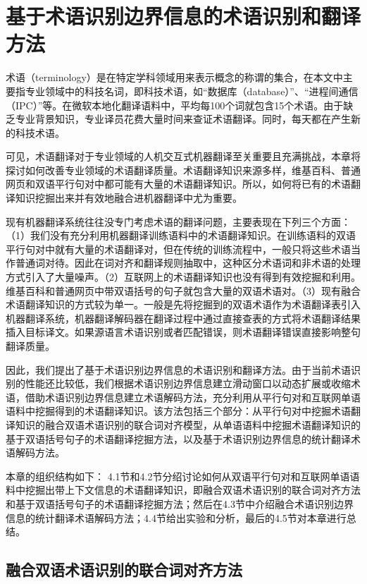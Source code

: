 
\chapter{基于术语识别边界信息的术语识别和翻译方法}
\label{Chapter_term}

术语（terminology）是在特定学科领域用来表示概念的称谓的集合，在本文中主要指专业领域中的科技名词，即科技术语，如“数据库（database）”、“进程间通信（IPC）”等。在微软本地化翻译语料中，平均每100个词就包含15个术语。由于缺乏专业背景知识，专业译员花费大量时间来查证术语翻译。同时，每天都在产生新的科技术语。

可见，术语翻译对于专业领域的人机交互式机器翻译至关重要且充满挑战，本章将探讨如何改善专业领域的术语翻译质量。术语翻译知识来源多样，维基百科、普通网页和双语平行句对中都可能有大量的术语翻译知识。所以，如何将已有的术语翻译知识挖掘出来并有效地融合进机器翻译中尤为重要。

现有机器翻译系统往往没专门考虑术语的翻译问题，主要表现在下列三个方面：（1）我们没有充分利用机器翻译训练语料中的术语翻译知识。在训练语料的双语平行句对中就有大量的术语翻译对，但在传统的训练流程中，一般只将这些术语当作普通词对待。因此在词对齐和翻译规则抽取中，这种区分术语词和非术语的处理方式引入了大量噪声。（2）互联网上的术语翻译知识也没有得到有效挖掘和利用。维基百科和普通网页中带双语括号的句子就包含大量的双语术语对。（3）现有融合术语翻译知识的方式较为单一。一般是先将挖掘到的双语术语作为术语翻译表引入机器翻译系统，机器翻译解码器在翻译过程中通过直接查表的方式将术语翻译结果插入目标译文。如果源语言术语识别或者匹配错误，则术语翻译错误直接影响整句翻译质量。

因此，我们提出了基于术语识别边界信息的术语识别和翻译方法。由于当前术语识别的性能还比较低，我们根据术语识别边界信息建立滑动窗口以动态扩展或收缩术语，借助术语识别边界信息建立术语解码方法，充分利用从平行句对和互联网单语语料中挖掘得到的术语翻译知识。该方法包括三个部分：从平行句对中挖掘术语翻译知识的融合双语术语识别的联合词对齐模型，从单语语料中挖掘术语翻译知识的基于双语括号句子的术语翻译挖掘方法，以及基于术语识别边界信息的统计翻译术语解码方法。

本章的组织结构如下： 4.1节和4.2节分绍讨论如何从双语平行句对和互联网单语语料中挖掘出带上下文信息的术语翻译知识，即融合双语术语识别的联合词对齐方法和基于双语括号句子的术语翻译挖掘方法；然后在4.3节中介绍融合术语识别边界信息的统计翻译术语解码方法；4.4节给出实验和分析，最后的4.5节对本章进行总结。

\section{融合双语术语识别的联合词对齐方法}

